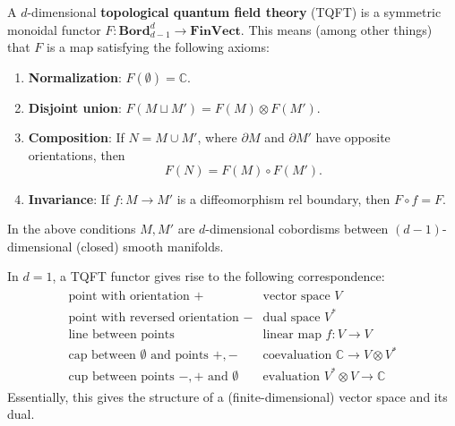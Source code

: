     \begin{axiom}
        A $d$-dimensional \textbf{topological quantum field theory} (TQFT) is a symmetric monoidal functor $F:\mathbf{Bord}_{d-1}^d\rightarrow\mathbf{FinVect}$. This means (among other things) that $F$ is a map satisfying the following axioms:
        \begin{enumerate}
            \item\textbf{Normalization}: $F(\emptyset)=\mathbb{C}$.
            \item\textbf{Disjoint union}: $F(M\sqcup M') = F(M)\otimes F(M')$.
            \item\textbf{Composition}: If $N=M\cup M'$, where $\partial M$ and $\partial M'$ have opposite orientations, then \[F(N) = F(M)\circ F(M').\]
            \item\textbf{Invariance}: If $f: M\rightarrow M'$ is a diffeomorphism rel boundary, then $F\circ f = F$.
        \end{enumerate}
        In the above conditions $M,M'$ are $d$-dimensional cobordisms between $(d-1)$-dimensional (closed) smooth manifolds.
    \end{axiom}

    \begin{example}[1D]
        In $d=1$, a TQFT functor gives rise to the following correspondence:
        \begin{gather*}
            \begin{array}{l|l}
                \text{point with orientation } + & \text{vector space } V\\
                \text{point with reversed orientation } - & \text{dual space }V^*\\
                \text{line between points} & \text{linear map }f:V\rightarrow V\\
                \text{cap between $\emptyset$ and points } +,- & \text{coevaluation } \mathbb{C}\rightarrow V\otimes V^*\\
                \text{cup between points $-,+$ and }\emptyset & \text{evaluation }V^*\otimes V\rightarrow\mathbb{C}
            \end{array}
        \end{gather*}
        Essentially, this gives the structure of a (finite-dimensional) vector space and its dual.
    \end{example}

